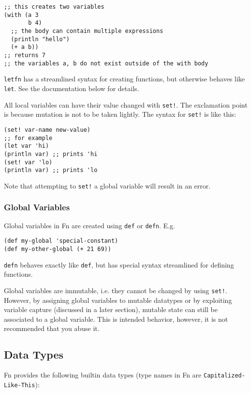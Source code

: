 \documentclass[11pt]{article}
\begin{document}
\begin{verbatim}
;; this creates two variables
(with (a 3
       b 4)
  ;; the body can contain multiple expressions
  (println "hello")
  (+ a b))
;; returns 7
;; the variables a, b do not exist outside of the with body
\end{verbatim}

\texttt{letfn} has a streamlined syntax for creating functions, but otherwise behaves
like \texttt{let}. See the documentation below for details.

All local variables can have their value changed with \texttt{set!}. The exclamation
point is because mutation is not to be taken lightly. The syntax for \texttt{set!} is
like this:

\begin{verbatim}
(set! var-name new-value)
;; for example
(let var 'hi)
(println var) ;; prints 'hi
(set! var 'lo)
(println var) ;; prints 'lo
\end{verbatim}

Note that attempting to \texttt{set!} a global variable will result in an error.


\subsubsection{Global Variables}
\label{sec:org25d2c11}

Global variables in Fn are created using \texttt{def} or \texttt{defn}. E.g.

\begin{verbatim}
(def my-global 'special-constant)
(def my-other-global (+ 21 69))
\end{verbatim}

\texttt{defn} behaves exactly like \texttt{def}, but has special syntax streamlined for defining
functions.

Global variables are immutable, i.e. they cannot be changed by using \texttt{set!}.
However, by assigning global variables to mutable datatypes or by exploiting
variable capture (discussed in a later section), mutable state can still be
associated to a global variable. This is intended behavior, however, it is not
recommended that you abuse it.


\subsection{Data Types}
\label{sec:orgd17d65e}

Fn provides the following builtin data types (type names in Fn are
\texttt{Capitalized-Like-This}):
\end{document}
